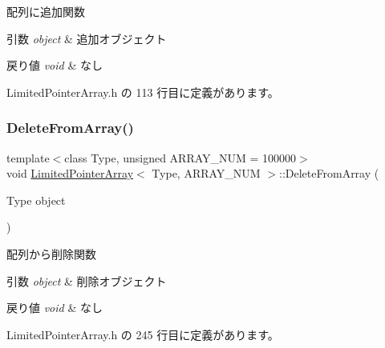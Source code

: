 配列に追加関数 


\begin{DoxyParams}{引数}
{\em object} & 追加オブジェクト \\
\hline
\end{DoxyParams}

\begin{DoxyRetVals}{戻り値}
{\em void} & なし \\
\hline
\end{DoxyRetVals}


 Limited\+Pointer\+Array.\+h の 113 行目に定義があります。

\mbox{\label{class_limited_pointer_array_a02cfaed541d27980883ec9eb90ad3813}} 
\subsubsection{\texorpdfstring{Delete\+From\+Array()}{DeleteFromArray()}}
{\footnotesize\ttfamily template$<$class Type, unsigned A\+R\+R\+A\+Y\+\_\+\+N\+UM = 100000$>$ \\
void \mbox{\hyperlink{class_limited_pointer_array}{Limited\+Pointer\+Array}}$<$ Type, A\+R\+R\+A\+Y\+\_\+\+N\+UM $>$\+::Delete\+From\+Array (\begin{DoxyParamCaption}\item[{Type}]{object }\end{DoxyParamCaption})\hspace{0.3cm}{\ttfamily [inline]}}



配列から削除関数 


\begin{DoxyParams}{引数}
{\em object} & 削除オブジェクト \\
\hline
\end{DoxyParams}

\begin{DoxyRetVals}{戻り値}
{\em void} & なし \\
\hline
\end{DoxyRetVals}


 Limited\+Pointer\+Array.\+h の 245 行目に定義があります。

\mbox{\label{class_limited_pointer_array_a2265f07827e70c2b154e8af1a4007efd}} 
